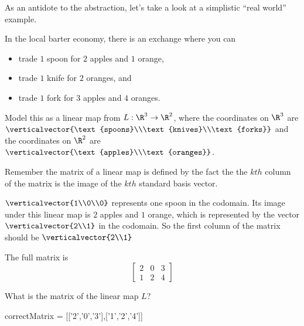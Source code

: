 \documentclass{ximera}
\begin{document}
As an antidote to the abstraction, let's take a look at a simplistic ``real world'' example.

\begin{question}
  In the local barter economy, there is an exchange where you can 
  \begin{itemize}
  \item trade $1$ spoon for $2$ apples and $1$ orange,
  \item trade $1$ knife for $2$ oranges, and
  \item trade $1$ fork for $3$ apples and $4$ oranges.
  \end{itemize}
  Model this as a linear map from $L:\R^3 \to \R^2$, where the coordinates on $\R^3$ are $\verticalvector{\text{spoons}\\\text{knives}\\\text{forks}}$ and the coordinates on $\R^2$ are
  $\verticalvector{\text{apples}\\\text{oranges}}$.

  \begin{solution}
  \begin{hint}
  	Remember the matrix of a linear map is defined by the fact the the $kth$ column of the matrix is
  	the image of the $kth$ standard basis vector.
  \end{hint}
  \begin{hint}
  	$\verticalvector{1\\0\\0}$ represents one spoon in the codomain.  Its image under this linear map is $2$ apples and $1$ orange, which is 
  	represented by the vector $\verticalvector{2\\1}$ in the codomain.  So the first column of the matrix should be $\verticalvector{2\\1}$ 
  \end{hint}
  \begin{hint}
  	The full matrix is 
  	\[
  		\begin{bmatrix}
  			2&0&3\\
  			1&2&4
  		\end{bmatrix}
  	\]
  \end{hint}
    What is the matrix of the linear map $L$?

    \begin{matrix-answer}[name=w]
      correctMatrix = [['2','0','3'],['1','2','4']]
    \end{matrix-answer}              
  \end{solution}


\end{question}
\end{document}
